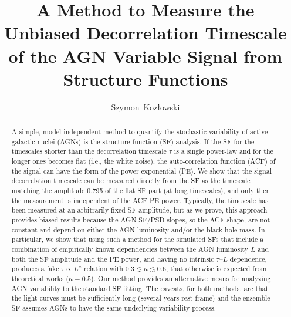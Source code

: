 \documentclass[twocolumn]{aastex6}
\begin{document}
\title{A Method to Measure the Unbiased Decorrelation Timescale of the AGN Variable Signal from Structure Functions}

\author{Szymon~Koz{\l}owski}



\begin{abstract}
A simple, model-independent method to quantify the stochastic variability of active galactic nuclei (AGNs) 
is the structure function (SF) analysis. If the SF for the timescales shorter
than the decorrelation timescale $\tau$ is a single power-law and for the longer ones becomes flat (i.e., the white noise), 
the auto-correlation function (ACF) of the signal can have the form of the power exponential (PE). 
We show that the signal decorrelation timescale can be measured
directly from the SF as the timescale matching the amplitude 0.795 of the flat SF part (at long timescales), 
and only then the measurement is independent of the ACF PE power.
Typically, the timescale has been measured at an arbitrarily fixed SF amplitude, but as we prove, this approach provides biased results because the AGN
SF/PSD slopes, so the ACF shape, are not constant and depend on either the AGN luminosity and/or
the black hole mass. In particular, we show that using such a method for the simulated SFs that include
a combination of empirically known dependencies between the AGN luminosity $L$ and both
the SF amplitude and the PE power, and having no intrinsic $\tau$--$L$ dependence, 
produces a fake $\tau \propto L^\kappa$ relation with $0.3\lesssim \kappa \lesssim 0.6$, that otherwise is expected from theoretical works ($\kappa \equiv 0.5$).
Our method provides an alternative means for analyzing AGN variability to the standard 
SF fitting. The caveats, for both methods, are that the light curves must be sufficiently long (several years rest-frame) and the ensemble
SF assumes AGNs to have the same underlying variability process.
\end{abstract}




\end{document}
